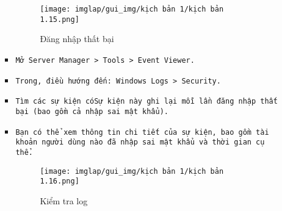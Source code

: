 \documentclass[13pt]{article}
\begin{document}
\begin{enumerate}
\begin{itemize}
\begin{itemize}
\begin{figure}[H]
    \centering
    \texttt{[image: imglap/gui\_img/kịch bản 1/kịch bản 1.15.png]}
    \caption{Đăng nhập thất bại}
    \label{fig:enter-label}
\end{figure}
        \item \texttt{Mở Server Manager > Tools > Event Viewer.}
        \item \texttt{Trong}\textbf{}\texttt{, điều hướng đến: Windows Logs > Security.}
        \item \texttt{Tìm các sự kiện có}\textbf{}\texttt{Sự kiện này ghi lại mỗi lần đăng nhập thất bại (bao gồm cả nhập sai mật khẩu).}
        \item \texttt{Bạn có thể xem thông tin chi tiết của sự kiện, bao gồm tài khoản người dùng nào đã nhập sai mật khẩu và thời gian cụ thể.}
        \begin{figure}[H]
            \centering
            \texttt{[image: imglap/gui\_img/kịch bản 1/kịch bản 1.16.png]}
            \caption{Kiểm tra log}
            \label{fig:enter-label}
        \end{figure}
        
        \end{itemize}
        \end{itemize}
        \end{enumerate}
\newpage        
\end{document}
